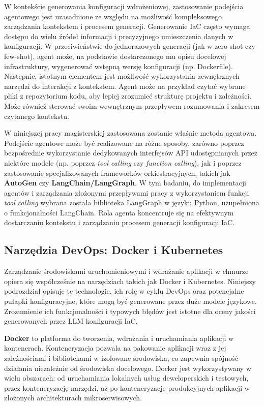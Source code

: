 W kontekście generowania konfiguracji wdrożeniowej, zastosowanie podejścia agentowego jest uzasadnione ze względu na możliwość kompleksowego zarządzania kontekstem i procesem generacji. Generowanie IaC często wymaga dostępu do wielu źródeł informacji i precyzyjnego umieszczenia danych w konfiguracji. W przeciwieństwie do jednorazowych generacji (jak w zero-shot czy few-shot), agent może, na podstawie dostarczonego mu opisu docelowej infrastruktury, wygenerować wstępną wersję konfiguracji (np. Dockerfile). Następnie, istotnym elementem jest możliwość wykorzystania zewnętrznych narzędzi do interakcji z kontekstem. Agent może na przykład czytać wybrane pliki z repozytorium kodu, aby lepiej zrozumieć strukturę projektu i zależności. Może również sterować swoim wewnętrznym przepływem rozumowania i zakresem czytanego kontekstu.

W niniejszej pracy magisterskiej zastosowana zostanie właśnie metoda agentowa. Podejście agentowe może być realizowane na różne sposoby, zarówno poprzez bezpośrednie wykorzystanie dedykowanych interfejsów API udostępnianych przez niektóre modele (np. poprzez \textit{tool calling} czy \textit{function calling}), jak i poprzez zastosowanie specjalizowanych frameworków orkiestracyjnych, takich jak \textbf{AutoGen} \cite{autogen} czy \textbf{LangChain/LangGraph}. W tym badaniu, do implementacji agentów i zarządzania złożonymi przepływami pracy z wykorzystaniem funkcji \textit{tool calling} wybrana została biblioteka LangGraph w języku Python, uzupełniona o funkcjonalności LangChain. Rola agenta koncentruje się na efektywnym dostarczaniu kontekstu i zarządzaniu procesem generacji konfiguracji IaC.

\subsection{Narzędzia DevOps: Docker i Kubernetes}

Zarządzanie środowiskami uruchomieniowymi i wdrażanie aplikacji w chmurze opiera się współcześnie na narzędziach takich jak Docker i Kubernetes. Niniejszy podrozdział opisuje te technologie, ich rolę w cyklu DevOps oraz potencjalne pułapki konfiguracyjne, które mogą być generowane przez duże modele językowe. Zrozumienie ich funkcjonalności i typowych błędów jest istotne dla oceny jakości generowanych przez LLM konfiguracji IaC.

\textbf{Docker} to platforma do tworzenia, wdrażania i uruchamiania aplikacji w kontenerach. Konteneryzacja pozwala na pakowanie aplikacji wraz z jej zależnościami i bibliotekami w izolowane środowiska, co zapewnia spójność działania niezależnie od środowiska docelowego. Docker jest wykorzystywany w wielu obszarach: od uruchamiania lokalnych usług deweloperskich i testowych, przez konteneryzację narzędzi, aż po konteneryzację produkcyjnych aplikacji w złożonych architekturach mikroserwisowych.

